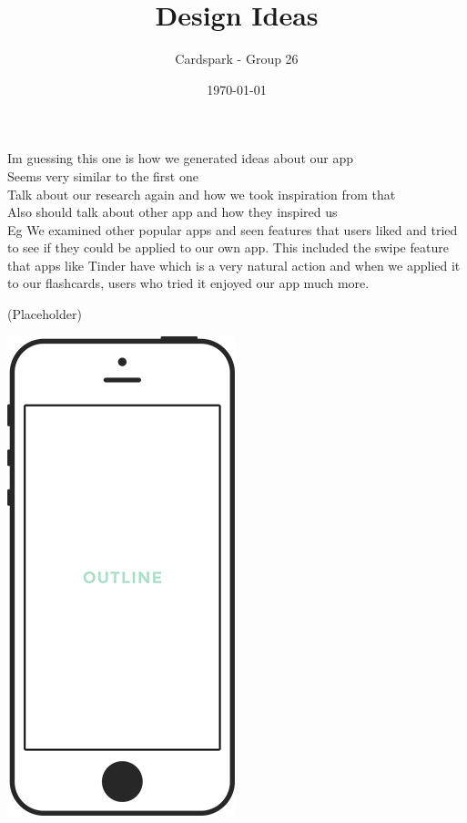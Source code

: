 \documentclass{article}
\begin{document}
\title{Design Ideas}
\author{Cardspark - Group 26}
\date{\today}
\maketitle

Im guessing this one is how we generated ideas about our app\\
Seems very similar to the first one\\
Talk about our research again and how we took inspiration from that\\
Also should talk about other app and how they inspired us\\

Eg
We examined other popular apps and seen features that users liked and tried to see if they could be applied to our own app. This included the swipe feature that apps like Tinder have which is a very natural action and when we applied it to our flashcards, users who tried it enjoyed our app much more. 


(Placeholder)
\begin{center}
	\vspace{1mm}
	\includegraphics[scale=0.2]{placeholder.png}
	\vspace{1mm}
\end{center}
\end{document}
